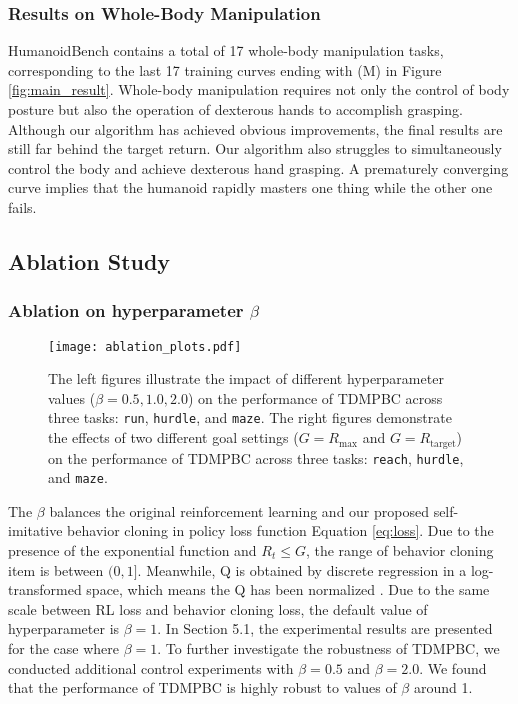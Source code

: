 \subsubsection{Results on Whole-Body Manipulation} 
HumanoidBench contains a total of 17 whole-body manipulation tasks, corresponding to the last 17 training curves ending with (M) in Figure \ref{fig:main_result}. 
Whole-body manipulation requires not only the control of body posture but also the operation of dexterous hands to accomplish grasping.
Although our algorithm has achieved obvious improvements, the final results are still far behind the target return. 
Our algorithm also struggles to simultaneously control the body and achieve dexterous hand grasping.
A prematurely converging curve implies that the humanoid rapidly masters one thing while the other one fails.

\subsection{Ablation Study}
\subsubsection{Ablation on hyperparameter $\beta$}
\begin{figure}[!b]
    \centering
    \vspace{-28pt}
    \texttt{[image: ablation\_plots.pdf]}
    \caption{The left figures illustrate the impact of different hyperparameter values ($\beta = 0.5, 1.0, 2.0$) on the performance of TDMPBC across three tasks: \texttt{run}, \texttt{hurdle}, and \texttt{maze}. The right figures demonstrate the effects of two different goal settings ($G = R_{\text{max}}$ and $G = R_{\text{target}}$) on the performance of TDMPBC across three tasks: \texttt{reach}, \texttt{hurdle}, and \texttt{maze}.}
    \label{fig:ablation}
    \vspace{-12pt}
\end{figure}

The $\beta$ balances the original reinforcement learning and our proposed self-imitative behavior cloning in policy loss function Equation \ref{eq:loss}.
Due to the presence of the exponential function and $R_t \leq G$, the range of behavior cloning item is between $(0, 1]$. 
Meanwhile, Q is obtained by discrete regression in a log-transformed space, which means the Q has been normalized \citep{hafner2023mastering}.
Due to the same scale between RL loss and behavior cloning loss, the default value of hyperparameter is $\beta=1$.
In Section 5.1, the experimental results are presented for the case where $\beta=1$. 
To further investigate the robustness of TDMPBC, we conducted additional control experiments with $\beta=0.5$ and $\beta=2.0$. 
We found that the performance of TDMPBC is highly robust to values of $\beta$ around 1.



